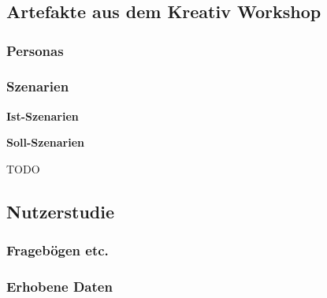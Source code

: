 \appendix
\chapter{}
\section{Artefakte aus dem Kreativ Workshop}



\subsection{Personas}

\subsection{Szenarien}

\textbf{Ist-Szenarien}

\textbf{Soll-Szenarien}

\label{code:appendix_example}
TODO


\section{Nutzerstudie}
\subsection{Fragebögen etc.}

\subsection{Erhobene Daten}